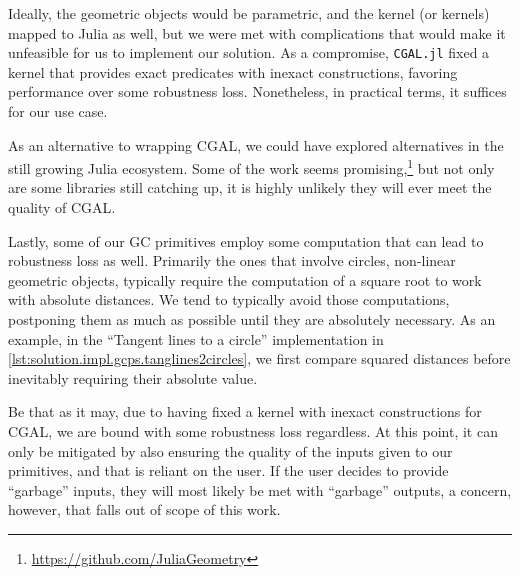 Ideally, the geometric objects would be parametric, and the kernel (or kernels)
mapped to Julia as well, but we were met with complications that would make it
unfeasible for us to implement our solution.  As a compromise, \texttt{CGAL.jl}
fixed a kernel that provides exact predicates with inexact constructions,
favoring performance over some robustness loss.  Nonetheless, in practical
terms, it suffices for our use case.

As an alternative to wrapping \ac{CGAL}, we could have explored alternatives in
the still growing Julia ecosystem.  Some of the work seems
promising,\footnote{\url{https://github.com/JuliaGeometry}} but not only are
some libraries still catching up, it is highly unlikely they will ever meet the
quality of \ac{CGAL}.

Lastly, some of our \ac{GC} primitives employ some computation that can lead to
robustness loss as well.  Primarily the ones that involve circles, non-linear
geometric objects, typically require the computation of a square root to work
with absolute distances.  We tend to typically avoid those computations,
postponing them as much as possible until they are absolutely necessary.  As an
example, in the ``Tangent lines to a circle'' implementation in
\cref{lst:solution.impl.gcps.tanglines2circles}, we first compare squared
distances before inevitably requiring their absolute value.

Be that as it may, due to having fixed a kernel with inexact constructions for
\ac{CGAL}, we are bound with some robustness loss regardless.  At this point, it
can only be mitigated by also ensuring the quality of the inputs given to our
primitives, and that is reliant on the user.  If the user decides to provide
``garbage'' inputs, they will most likely be met with ``garbage'' outputs, a
concern, however, that falls out of scope of this work.
